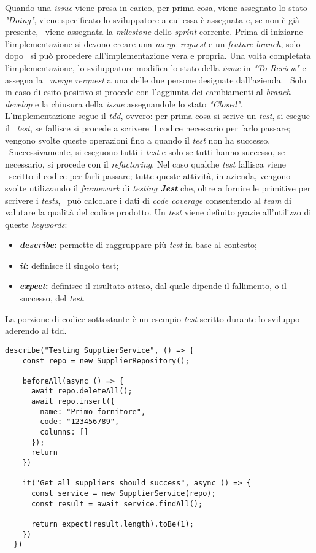 Quando una \emph{issue} viene presa in carico, per prima cosa, viene assegnato lo stato \emph{"Doing"}, viene specificato lo sviluppatore a cui essa è assegnata e, se non è già presente, \
viene assegnata la \emph{milestone} dello \emph{sprint} corrente. Prima di iniziarne l'implementazione si devono creare una \emph{merge request} e un \emph{feature branch}, solo dopo \
si può procedere all'implementazione vera e propria. Una volta completata l'implementazione, lo sviluppatore modifica lo stato della \emph{issue} in \emph{"To Review"} e assegna la \
\emph{merge rerquest} a una delle due persone designate dall'azienda. \
Solo in caso di esito positivo si procede con l'aggiunta dei cambiamenti al \emph{branch develop} e la chiusura della \emph{issue} assegnandole lo stato \emph{"Closed"}. \\

L'implementazione segue il \emph{\acrlong{tdd}}, ovvero: per prima cosa si scrive un \emph{test}, si esegue il \
\emph{test}, se fallisce si procede a scrivere il codice necessario per farlo passare; vengono svolte queste operazioni fino a quando il \emph{test} non ha successo. \
Successivamente, si eseguono tutti i \emph{test} e solo se tutti hanno successo, se necessario, si procede con il \emph{refactoring}. Nel caso qualche \emph{test} fallisca viene \
scritto il codice per farli passare; tutte queste attività, in azienda, vengono svolte utilizzando il \emph{framework} di \emph{testing \textbf{Jest}} che, oltre a fornire le primitive per scrivere i \emph{tests}, \
può calcolare i dati di \emph{code coverage} consentendo al \emph{team} di valutare la qualità del codice prodotto. Un \emph{test} viene definito grazie all'utilizzo di queste \emph{keywords}:
\begin{itemize}
  \item \textbf{\emph{describe}:} permette di raggruppare più \emph{test} in base al contesto;
  \item \textbf{\emph{it}:} definisce il singolo test;
  \item \textbf{\emph{expect}:} definisce il risultato atteso, dal quale dipende il fallimento, o il successo, del \emph{test}.
\end{itemize}
La porzione di codice sottostante è un esempio \emph{test} scritto durante lo sviluppo aderendo al \acrshort{tdd}.
\newpage
\begin{lstlisting}[caption=Esempio di \emph{test}, captionpos=b]
  describe("Testing SupplierService", () => {
    const repo = new SupplierRepository();

    beforeAll(async () => {
      await repo.deleteAll();
      await repo.insert({
        name: "Primo fornitore",
        code: "123456789",
        columns: []
      });
      return 
    })

    it("Get all suppliers should success", async () => {
      const service = new SupplierService(repo);
      const result = await service.findAll();

      return expect(result.length).toBe(1);
    })
  })
\end{lstlisting}

